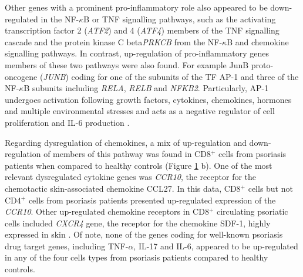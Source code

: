\begin{figure}[htbp]
\label{figure:RNAseq_PS_CTL_CD8_TNF_and_chemokine_pathway_modified}
\end{figure}





Other genes with a prominent pro-inflammatory role also appeared to be down-regulated in the NF-$\kappa$B or TNF signalling pathways, such as the activating transcription factor 2 (\textit{ATF2}) and 4 (\textit{ATF4}) members of the TNF signalling cascade and the protein kinase C beta\textit{PRKCB} from the NF-$\kappa$B and chemokine signalling pathways. In contrast, up-regulation of pro-inflammatory genes members of these two pathways were also found. For example JunB proto-oncogene (\textit{JUNB}) coding for one of the subunits of the TF AP-1 and three of the NF-$\kappa$B subunits including \textit{RELA}, \textit{RELB} and \textit{NFKB2}. Particularly, AP-1 undergoes activation following growth factors, cytokines, chemokines, hormones and multiple environmental stresses and acts as a negative regulator of cell proliferation and IL-6 production \parencite{Schonthaler2011}.

Regarding dysregulation of chemokines, a mix of up-regulation and down-regulation of members of this pathway was found in CD8$^+$ cells from psoriasis patients when compared to healthy controls (Figure \ref{figure:RNAseq_PS_CTL_CD8_TNF_and_chemokine_pathway_modified} b). One of the most relevant dysregulated cytokine genes was \textit{CCR10}, the receptor for the chemotactic skin-associated chemokine CCL27. In this data, CD8$^+$ cells but not CD4$^+$ cells from psoriasis patients presented up-regulated expression of the \textit{CCR10}. Other up-regulated chemokine receptors in CD8$^+$ circulating psoriatic cells included \textit{CXCR4} gene, the receptor for the chemokine SDF-1, highly expressed in skin \parencite{Zgraggen2014}. Of note, none of the genes coding for well-known psoriasis drug target genes, including TNF-$\alpha$, IL-17 and IL-6, appeared to be up-regulated in any of the four cells types from psoriasis patients compared to healthy controls.



